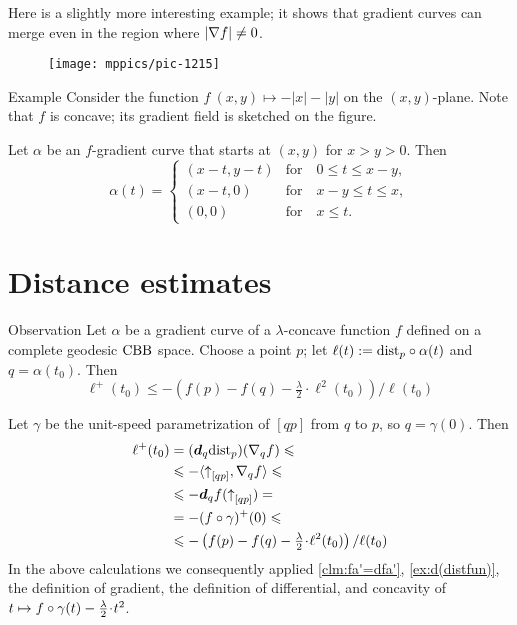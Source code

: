 Here is a slightly more interesting example;
it shows that gradient curves can merge even in the region where $|\nabla f|\z\ne 0$. 


\begin{wrapfigure}[8]{r}{34 mm}
\vskip-0mm
\centering
\texttt{[image: mppics/pic-1215]}
\vskip0mm
\end{wrapfigure}

\begin{thm}{Example}
Consider the function $f\:(x,y)\mapsto-|x|-|y|$ on the $(x,y)$-plane.
Note that $f$ is concave;
its gradient field is sketched on the figure.

Let $\alpha$ be an $f$-gradient curve that starts at $(x,y)$ for $x>y>0$.
Then 
\[\alpha(t)=
\begin{cases}
(x-t,y-t) &\text{for}\quad 0\le t\le  x-y,
\\
(x-t,0) &\text{for}\quad x-y\le t\le  x,
\\
(0,0) &\text{for}\quad x\le t.
\end{cases}
\]

\end{thm}


\section{Distance estimates}

\begin{thm}{Observation}\label{eq:fist-var-inq+}
Let $\alpha$ be a gradient curve of a $\lambda$-concave function $f$ 
defined on a complete geodesic $\mathrm{CBB}$ space.
Choose a point $p$; let $\ell(t)\mathrel{:=}\mathrm{dist}_p\circ\alpha(t)$ and $q=\alpha(t_0)$.
Then 
\[
\ell^+(t_0)\le -\left({f(p)}-{f(q)}-\tfrac\lambda2\cdot\ell^2(t_0)\right)/\ell(t_0)
\]
\end{thm}

Let $\gamma$ be the unit-speed parametrization of $[qp]$ from $q$ to $p$, so $q=\gamma(0)$.
Then 
\begin{align*}
\ell^+(t_0)&=(\dd_q\distfun_p)(\nabla_qf)\le
\\
&\le -\langle\dir qp,\nabla_qf\rangle \le
\\
&\le -\dd_qf(\dir qp)=
\\
&=-(f\circ\gamma)^+(0)\le
\\
&\le -\left({f(p)}-{f(q)}-\tfrac\lambda2\cdot\ell^2(t_0)\right)/\ell(t_0)
\end{align*}
In the above calculations we consequently applied
\ref{clm:fa'=dfa'},
\ref{ex:d(distfun)},
the definition of gradient,
the definition of differential,
and concavity of $t\z\mapsto f\circ\gamma(t)-\tfrac \lambda2\cdot {t^2}$.
\qeds

